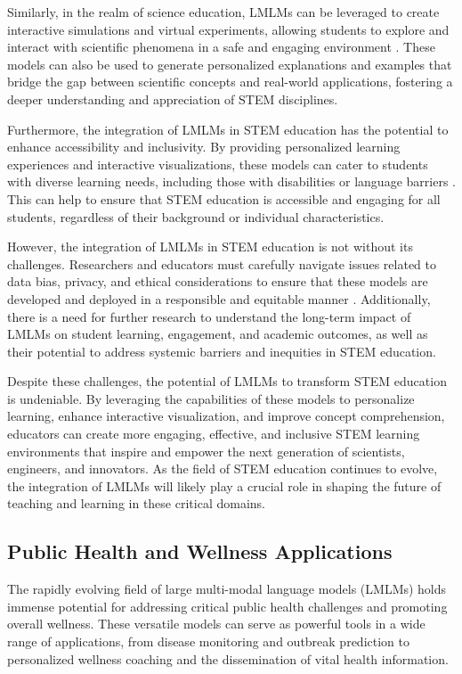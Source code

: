 \documentclass[11pt]{article}
\begin{document}
Similarly, in the realm of science education, LMLMs can be leveraged to create interactive simulations and virtual experiments, allowing students to explore and interact with scientific phenomena in a safe and engaging environment \cite{ref74}. These models can also be used to generate personalized explanations and examples that bridge the gap between scientific concepts and real-world applications, fostering a deeper understanding and appreciation of STEM disciplines.

Furthermore, the integration of LMLMs in STEM education has the potential to enhance accessibility and inclusivity. By providing personalized learning experiences and interactive visualizations, these models can cater to students with diverse learning needs, including those with disabilities or language barriers \cite{ref209}. This can help to ensure that STEM education is accessible and engaging for all students, regardless of their background or individual characteristics.

However, the integration of LMLMs in STEM education is not without its challenges. Researchers and educators must carefully navigate issues related to data bias, privacy, and ethical considerations to ensure that these models are developed and deployed in a responsible and equitable manner \cite{ref14}. Additionally, there is a need for further research to understand the long-term impact of LMLMs on student learning, engagement, and academic outcomes, as well as their potential to address systemic barriers and inequities in STEM education.

Despite these challenges, the potential of LMLMs to transform STEM education is undeniable. By leveraging the capabilities of these models to personalize learning, enhance interactive visualization, and improve concept comprehension, educators can create more engaging, effective, and inclusive STEM learning environments that inspire and empower the next generation of scientists, engineers, and innovators. As the field of STEM education continues to evolve, the integration of LMLMs will likely play a crucial role in shaping the future of teaching and learning in these critical domains.

\subsection{Public Health and Wellness Applications}

The rapidly evolving field of large multi-modal language models (LMLMs) holds immense potential for addressing critical public health challenges and promoting overall wellness. These versatile models can serve as powerful tools in a wide range of applications, from disease monitoring and outbreak prediction to personalized wellness coaching and the dissemination of vital health information.
\end{document}
